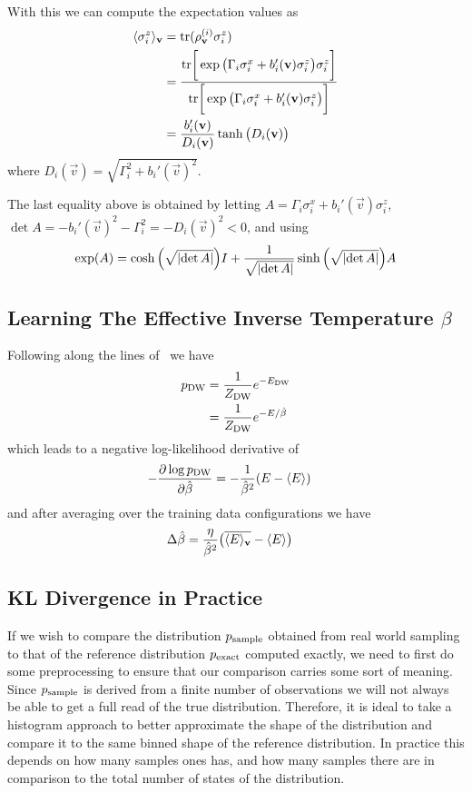 With this we can compute the expectation values as
\begin{align}
    \langle \sigma_i^z \rangle_{\mathbf{v}}
        &= \text{tr}(\rho_{\mathbf{v}}^{(i)}\sigma_i^z) \\
        &= \frac{\text{tr}\bigg[ \exp \big(\Gamma_i \sigma_i^x + b_i'(\mathbf{v}) \sigma_i^z\big) \sigma_i^z \bigg]}{\text{tr}\bigg[ \exp \big(\Gamma_i \sigma_i^x + b_i'(\mathbf{v}) \sigma_i^z\big) \bigg]} \\
        &= \frac{b_i'(\mathbf{v})}{D_i(\mathbf{v})} \tanh\big(D_i(\mathbf{v})\big)
\end{align}
where \( D_i(\vec{v}) = \sqrt{\Gamma_i^2 + b_i'(\vec{v})^2} \).

The last equality above is obtained by letting \( A = \Gamma_i \sigma_i^x + b_i'(\vec{v})\sigma_i^z \), \( \det A = -b_i'(\vec{v})^2 - \Gamma_i^2 = -D_i(\vec{v})^2 < 0 \), and using
\begin{align}
    \exp(A) = \cosh\Big(\sqrt{\lvert\det A\rvert}\Big) I + \frac{1}{\sqrt{\lvert\det A\rvert}}\sinh\Big(\sqrt{\lvert\det A\rvert}\Big) A
\end{align}

\subsection{Learning The Effective Inverse Temperature \( \beta \)}\label{app:learning_beta}
Following along the lines of~\cite{xu_2021} we have
\begin{align}
    p_\text{DW}
        &= \frac{1}{Z_\text{DW}} e^{-E_\text{DW}} \\
        &= \frac{1}{Z_\text{DW}} e^{-E / \hat{\beta}} \\
\end{align}
which leads to a negative log-likelihood derivative of
\begin{align}
    -\frac{\partial \log p_\text{DW}}{\partial\hat{\beta}}
        &= -\frac{1}{\hat{\beta}^2} (E - \langle E \rangle)
\end{align}
and after averaging over the training data configurations we have
\begin{align}
    \Delta\hat{\beta}
        &= \frac{\eta}{\hat{\beta}^2}\big(\overline{\langle E \rangle_{\mathbf{v}}} - \langle E \rangle\big)
\end{align}

\subsection{KL Divergence in Practice}\label{app:kl_divergence_in_practice}
If we wish to compare the distribution \( p_{\text{sample}} \) obtained from real world sampling to that of the reference distribution \( p_{\text{exact}} \) computed exactly, we need to first do some preprocessing to ensure that our comparison carries some sort of meaning.
Since \( p_{\text{sample}} \) is derived from a finite number of observations we will not always be able to get a full read of the true distribution.
Therefore, it is ideal to take a histogram approach to better approximate the shape of the distribution and compare it to the same binned shape of the reference distribution.
In practice this depends on how many samples ones has, and how many samples there are in comparison to the total number of states of the distribution.

